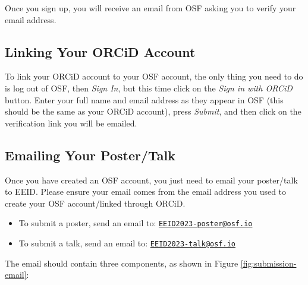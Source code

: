 \documentclass{scrartcl}
\begin{document}
Once you sign up, you will receive an email from OSF asking you to verify your email address.

\subsection{Linking Your ORCiD Account}

To link your ORCiD account to your OSF account, the only thing you need to do is log out of OSF, then \emph{Sign In}, but this time click on the \emph{Sign in with ORCiD} button.
Enter your full name and email address as they appear in OSF (this should be the same as your ORCiD account), press \emph{Submit}, and then click on the verification link you will be emailed.

\subsection{Emailing Your Poster/Talk}

Once you have created an OSF account, you just need to email your poster/talk to EEID. Please ensure your email comes from the email address you used to create your OSF account/linked through ORCiD.

\begin{itemize}
    \item To submit a poster, send an email to: \href{mailto:EEID2023-poster@osf.io}{\texttt{EEID2023-poster@osf.io}}
    \item To submit a talk, send an email to: \href{mailto:EEID2023-talk@osf.io}{\texttt{EEID2023-talk@osf.io}}
\end{itemize}

The email should contain three components, as shown in Figure \ref{fig:submission-email}:
\end{document}
